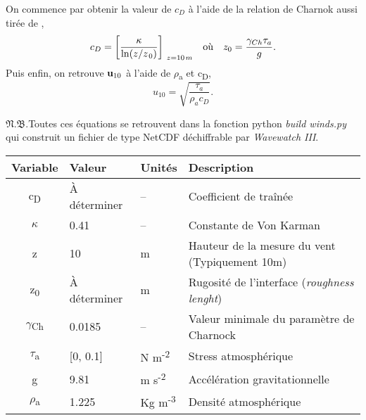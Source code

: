 \documentclass[10pt]{report}
\numberwithin{equation}{section}
\newcommand{\pt}{\hspace{1pt}} %
\newcommand{\nb}{\underline{{\footnotesize\EightStarConvex}\pt $\mathfrak{N.B.}$\vphantom{p}}\hspace{3pt}}
\begin{document}
On commence par obtenir la valeur de \(c_D\) à l'aide de la relation de Charnok \autocite{charnock1955wind} aussi tirée de \Textcite[p.30]{gill-atmosphere-ocean},
\begin{align}
\label{eq:org9e04412}
   &&c_D = \qty[\frac{\kappa}{\ln(z/z_{\pt0})}]_{\ z=10\pt m}
   && \text{où} &&
   z_0 = \frac{\gamma_{Ch}\tau_a}{g}. &&
\end{align}
Puis enfin, on retrouve \(\vb{u}_{10}\) à l'aide de \(\rho\)\textsubscript{a} et c\textsubscript{D},
\begin{equation}
   u_{10} = \sqrt{\frac{\tau_a}{\rho_a c_D}}.
\end{equation}

\nb Toutes ces équations se retrouvent dans la fonction python \emph{build winds.py} qui construit un fichier de type NetCDF déchiffrable par \emph{Wavewatch III}.
\begin{center}
\begin{tabular}{clll}
Variable & Valeur & Unités & Description\\[0pt]
\hline
c\textsubscript{D} & À déterminer & -- & Coefficient de traînée\\[0pt]
\(\kappa\) & 0.41 & -- & Constante de Von Karman\\[0pt]
z & 10 & m & Hauteur de la mesure du vent (Typiquement 10m)\\[0pt]
z\textsubscript{0} & À déterminer & m & Rugosité de l'interface (\emph{roughness lenght})\\[0pt]
\(\gamma\)\textsubscript{Ch} & 0.0185 & -- & Valeur minimale du paramètre de Charnock\\[0pt]
\(\tau\)\textsubscript{a} & [0, 0.1] & N m\textsuperscript{-2} & Stress atmosphérique\\[0pt]
g & 9.81 & m s\textsuperscript{-2} & Accélération gravitationnelle\\[0pt]
\(\rho\)\textsubscript{a} & 1.225 & Kg m\textsuperscript{-3} & Densité atmosphérique\\[0pt]
\end{tabular}
\end{center}
\end{document}
